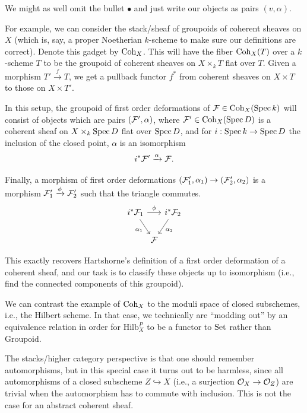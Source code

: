 \documentclass[12pt]{article}
\newcommand{\Hilb}{\mathrm{Hilb}}
\newcommand{\Groupoid}{\mathrm{Groupoid}}
\begin{document}
We might as well omit the bullet $\bullet$ and just write our objects as pairs $(v,\alpha)$.

For example, we can consider the stack/sheaf of groupoids of coherent sheaves on $X$ (which is, say, a proper Noetherian $k$-scheme to make sure our definitions are correct). Denote this gadget by $\operatorname{Coh}_X$. This will have the fiber $\operatorname{Coh}_X(T)$ over a $k$-scheme $T$ to be the groupoid of coherent sheaves on $X\times_k T$ flat over $T$. Given a morphism $T' \xrightarrow{f} T$, we get a pullback functor $f^*$ from coherent sheaves on $X\times T$ to those on $X\times T'$.

In this setup, the groupoid of first order deformations of $\mathcal{F} \in \operatorname{Coh}_X(\operatorname{Spec} k)$ will consist of objects which are pairs $(\mathcal{F}',\alpha)$, where $\mathcal{F}'\in \operatorname{Coh}_X(\operatorname{Spec} D)$ is a coherent sheaf on $X\times_k \operatorname{Spec} D$ flat over $\operatorname{Spec} D$, and for $i:\operatorname{Spec} k\to \operatorname{Spec} D$ the inclusion of the closed point, $\alpha$ is an isomorphism
\[i^* \mathcal{F}' \xrightarrow{\alpha} \mathcal{F}.\]

Finally, a morphism of first order deformations $(\mathcal{F}_1',\alpha_1) \to (\mathcal{F}_2',\alpha_2)$ is a morphism $\cF_1'\xrightarrow{\phi} \cF_2'$ such that the triangle commutes.
\[\begin{tikzcd}[column sep=0cm]
    i^*\cF_1 \ar[dr,"\alpha_1"']\ar[rr, "\phi"] && i^* \cF_2 \ar[dl,"\alpha_2"]\\
    & \cF &
\end{tikzcd}\]

This exactly recovers Hartshorne's definition of a first order deformation of a coherent sheaf, and our task is to classify these objects up to isomorphism (i.e., find the connected components of this groupoid).

\begin{rmk}
    We can contrast the example of $\operatorname{Coh}_X$ to the moduli space of closed subschemes, i.e., the Hilbert scheme. In that case, we technically are ``modding out'' by an equivalence relation in order for $\Hilb^P_X$ to be a functor to $\mathrm{Set}$ rather than $\Groupoid$.
    
    The stacks/higher category perspective is that one should remember automorphisms, but in this special case it turns out to be harmless, since all automorphisms of a closed subscheme $Z\hookrightarrow X$ (i.e., a surjection $\mathcal{O}_X\to \mathcal{O}_Z$) are trivial when the automorphism has to commute with inclusion. This is not the case for an abstract coherent sheaf.
\end{rmk}
\end{document}
